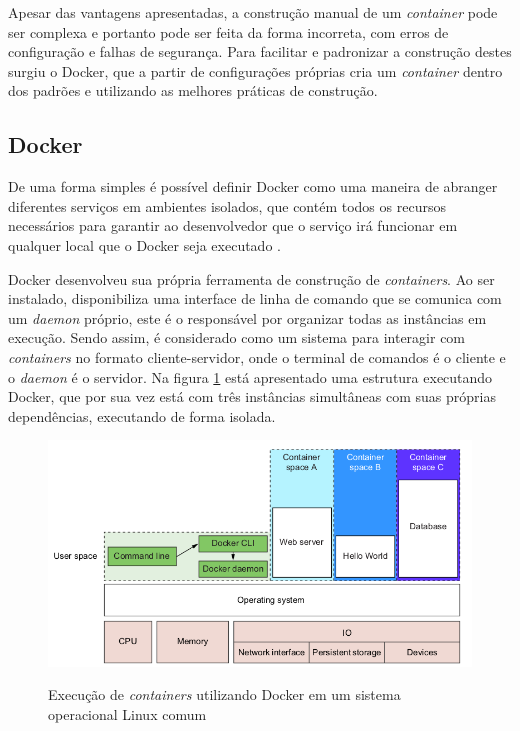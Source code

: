 	Apesar das vantagens apresentadas, a construção manual de um \textit{container} pode ser complexa e portanto pode ser feita da forma incorreta, com erros de configuração e falhas de segurança. Para facilitar e padronizar a construção destes surgiu o Docker, que a partir de configurações próprias cria um \textit{container} dentro dos padrões e utilizando as melhores práticas de construção.
\subsection{Docker}
	De uma forma simples é possível definir Docker como uma maneira de abranger diferentes serviços em ambientes isolados, que contém todos os recursos necessários para garantir ao desenvolvedor que o serviço irá funcionar em qualquer local que o Docker seja executado \cite{Hane}.
	
	Docker desenvolveu sua própria ferramenta de construção de \textit{containers}. Ao ser instalado, disponibiliza uma interface de linha de comando que se comunica com um \textit{daemon} próprio, este é o responsável por organizar todas as instâncias em execução. Sendo assim, é considerado como um sistema para interagir com \textit{containers} no formato cliente-servidor, onde o terminal de comandos é o cliente e o \textit{daemon} é o servidor. Na figura \ref{fig:Docker-daemon} está apresentado uma estrutura executando Docker, que por sua vez está com três instâncias simultâneas com suas próprias dependências, executando de forma isolada.
	
	\begin{figure}[htb]
		\caption{Execução de \textit{containers} utilizando Docker em um sistema operacional Linux comum}
		{\parbox{6cm}{
				\includegraphics[width=15cm]{images/docker-daemon.png}
				\label{fig:Docker-daemon}
		}}
	\end{figure}


